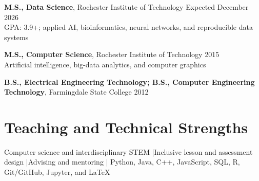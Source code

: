 \documentclass[10pt,letterpaper]{article}
\begin{document}
\textbf{M.S., Data Science}, Rochester Institute of Technology
\hfill Expected December 2026\\
GPA: 3.9+; applied AI, bioinformatics, neural networks, and reproducible data systems

\textbf{M.S., Computer Science}, Rochester Institute of Technology
\hfill 2015\\
Artificial intelligence, big-data analytics, and computer graphics

\textbf{B.S., Electrical Engineering Technology; B.S., Computer Engineering Technology},
Farmingdale State College \hfill 2012

\section*{Teaching and Technical Strengths}
Computer science and interdisciplinary STEM \enspace|\enspace Inclusive lesson
and assessment design \enspace|\enspace Advising and mentoring \enspace|\enspace
Python, Java, C++, JavaScript, SQL, R, Git/GitHub, Jupyter, and LaTeX
\end{document}
